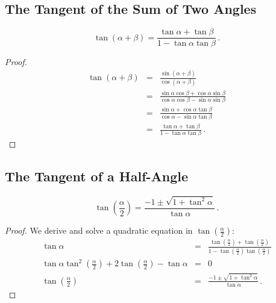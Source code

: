
\newpage

\subsection{The Tangent of the Sum of Two Angles}\label{s.tangent-sum}

\begin{theorem}\label{thm.tangent-sum}
\[
\tan (\alpha+\beta) =\frac{\tan\alpha+\tan\beta}{1-\tan\alpha\tan\beta}\,.
\]
\end{theorem}

\begin{proof}

\begin{eqnarray*}
\tan (\alpha+\beta) &=& \frac{\sin(\alpha+\beta)}{\cos(\alpha+\beta)}\\
&=&\frac{\sin\alpha\cos\beta+\cos\alpha\sin\beta}{\cos\alpha\cos\beta-\sin\alpha\sin\beta}\\
&=&\frac{\sin\alpha+\cos\alpha\tan\beta}{\cos\alpha-\sin\alpha\tan\beta}\\
&=&\frac{\tan\alpha+\tan\beta}{1-\tan\alpha\tan\beta}\,.
\end{eqnarray*}

\end{proof}


\subsection{The Tangent of a Half-Angle}\label{s.tangent-half}
\begin{theorem}\label{thm.tangent-half}
\[
\tan\left(\frac{\alpha}{2}\right) = \frac{-1\pm\sqrt{1+\tan^2\alpha}}{\tan\alpha}\,.
\]
\end{theorem}
\begin{proof}
We derive and solve a quadratic equation in $\displaystyle\tan\left(\displaystyle\frac{\alpha}{2}\right)$:
\begin{displaymath}
\begin{array}{lll}
\tan \alpha&=&\displaystyle\frac{
  \tan\left(\displaystyle\frac{\alpha}{2}\right)+
  \tan\left(\displaystyle\frac{\alpha}{2}\right)
  }{
  1-\tan\left(\displaystyle\frac{\alpha}{2}\right)
    \tan\left(\displaystyle\frac{\alpha}{2}\right)
  }\\
\tan\alpha \tan^2  \left(\displaystyle\frac{\alpha}{2}\right) + 2 \tan \left(\displaystyle\frac{\alpha}{2}\right) -\tan\alpha &=&0\\
\tan\left(\displaystyle\frac{\alpha}{2}\right) &=& \displaystyle\frac{-1\pm\sqrt{1+\tan^2\alpha}}{\tan\alpha}\,.
\end{array}
\end{displaymath}
\end{proof}

